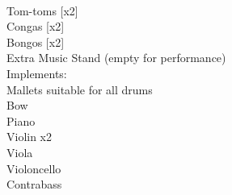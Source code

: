 \documentclass[11pt]{article}
\begin{document}
\\
\hspace*{3cm} Tom-toms [x2]
\\
\hspace*{3cm} Congas [x2]
\\
\hspace*{3cm} Bongos [x2]
\\
\hspace*{3cm} Extra Music Stand (empty for performance)
\\
\hspace*{2cm} Implements:
\\
\hspace*{3cm} Mallets suitable for all drums
\\
\hspace*{3cm} Bow
\\
\hspace*{1cm} Piano
\\
\hspace*{1cm} Violin x2
\\
\hspace*{1cm} Viola
\\
\hspace*{1cm} Violoncello
\\
\hspace*{1cm} Contrabass

\vspace*{1.25\baselineskip}
\end{document}
